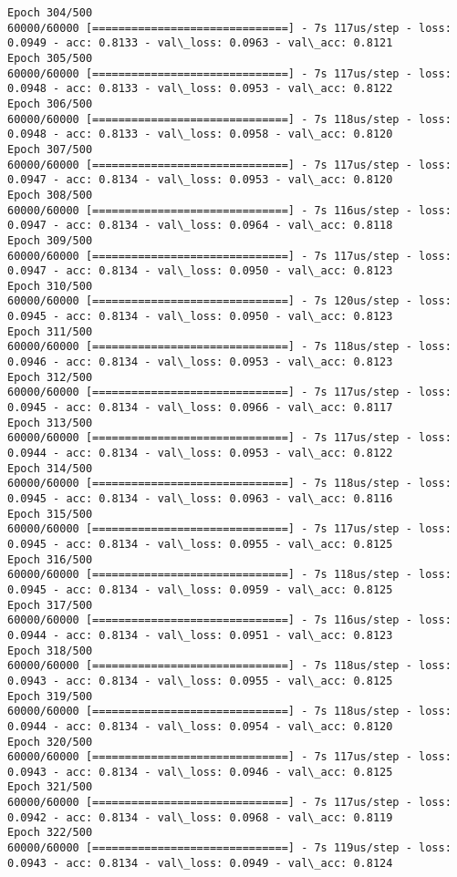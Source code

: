 \documentclass[11pt]{article}
\begin{document}
\begin{Verbatim}[commandchars=\\\{\}]
Epoch 304/500
60000/60000 [==============================] - 7s 117us/step - loss: 0.0949 - acc: 0.8133 - val\_loss: 0.0963 - val\_acc: 0.8121
Epoch 305/500
60000/60000 [==============================] - 7s 117us/step - loss: 0.0948 - acc: 0.8133 - val\_loss: 0.0953 - val\_acc: 0.8122
Epoch 306/500
60000/60000 [==============================] - 7s 118us/step - loss: 0.0948 - acc: 0.8133 - val\_loss: 0.0958 - val\_acc: 0.8120
Epoch 307/500
60000/60000 [==============================] - 7s 117us/step - loss: 0.0947 - acc: 0.8134 - val\_loss: 0.0953 - val\_acc: 0.8120
Epoch 308/500
60000/60000 [==============================] - 7s 116us/step - loss: 0.0947 - acc: 0.8134 - val\_loss: 0.0964 - val\_acc: 0.8118
Epoch 309/500
60000/60000 [==============================] - 7s 117us/step - loss: 0.0947 - acc: 0.8134 - val\_loss: 0.0950 - val\_acc: 0.8123
Epoch 310/500
60000/60000 [==============================] - 7s 120us/step - loss: 0.0945 - acc: 0.8134 - val\_loss: 0.0950 - val\_acc: 0.8123
Epoch 311/500
60000/60000 [==============================] - 7s 118us/step - loss: 0.0946 - acc: 0.8134 - val\_loss: 0.0953 - val\_acc: 0.8123
Epoch 312/500
60000/60000 [==============================] - 7s 117us/step - loss: 0.0945 - acc: 0.8134 - val\_loss: 0.0966 - val\_acc: 0.8117
Epoch 313/500
60000/60000 [==============================] - 7s 117us/step - loss: 0.0944 - acc: 0.8134 - val\_loss: 0.0953 - val\_acc: 0.8122
Epoch 314/500
60000/60000 [==============================] - 7s 118us/step - loss: 0.0945 - acc: 0.8134 - val\_loss: 0.0963 - val\_acc: 0.8116
Epoch 315/500
60000/60000 [==============================] - 7s 117us/step - loss: 0.0945 - acc: 0.8134 - val\_loss: 0.0955 - val\_acc: 0.8125
Epoch 316/500
60000/60000 [==============================] - 7s 118us/step - loss: 0.0945 - acc: 0.8134 - val\_loss: 0.0959 - val\_acc: 0.8125
Epoch 317/500
60000/60000 [==============================] - 7s 116us/step - loss: 0.0944 - acc: 0.8134 - val\_loss: 0.0951 - val\_acc: 0.8123
Epoch 318/500
60000/60000 [==============================] - 7s 118us/step - loss: 0.0943 - acc: 0.8134 - val\_loss: 0.0955 - val\_acc: 0.8125
Epoch 319/500
60000/60000 [==============================] - 7s 118us/step - loss: 0.0944 - acc: 0.8134 - val\_loss: 0.0954 - val\_acc: 0.8120
Epoch 320/500
60000/60000 [==============================] - 7s 117us/step - loss: 0.0943 - acc: 0.8134 - val\_loss: 0.0946 - val\_acc: 0.8125
Epoch 321/500
60000/60000 [==============================] - 7s 117us/step - loss: 0.0942 - acc: 0.8134 - val\_loss: 0.0968 - val\_acc: 0.8119
Epoch 322/500
60000/60000 [==============================] - 7s 119us/step - loss: 0.0943 - acc: 0.8134 - val\_loss: 0.0949 - val\_acc: 0.8124

\end{Verbatim}
\end{document}
